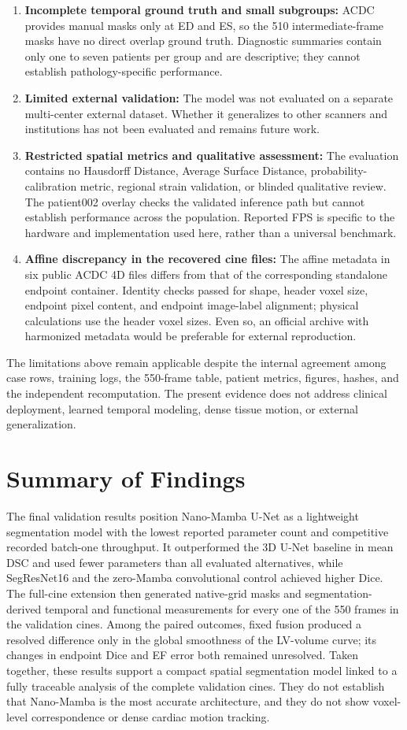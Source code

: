 \begin{enumerate}
    \item \textbf{Incomplete temporal ground truth and small subgroups:} ACDC provides manual masks only at ED and ES, so the 510 intermediate-frame masks have no direct overlap ground truth. Diagnostic summaries contain only one to seven patients per group and are descriptive; they cannot establish pathology-specific performance.
    \item \textbf{Limited external validation:} The model was not evaluated on a separate multi-center external dataset. Whether it generalizes to other scanners and institutions has not been evaluated and remains future work.
    \item \textbf{Restricted spatial metrics and qualitative assessment:} The evaluation contains no Hausdorff Distance, Average Surface Distance, probability-calibration metric, regional strain validation, or blinded qualitative review. The patient002 overlay checks the validated inference path but cannot establish performance across the population. Reported FPS is specific to the hardware and implementation used here, rather than a universal benchmark.
    \item \textbf{Affine discrepancy in the recovered cine files:} The affine metadata in six public ACDC 4D files differs from that of the corresponding standalone endpoint container. Identity checks passed for shape, header voxel size, endpoint pixel content, and endpoint image-label alignment; physical calculations use the header voxel sizes. Even so, an official archive with harmonized metadata would be preferable for external reproduction.
\end{enumerate}

The limitations above remain applicable despite the internal agreement among case rows, training logs, the 550-frame table, patient metrics, figures, hashes, and the independent recomputation. The present evidence does not address clinical deployment, learned temporal modeling, dense tissue motion, or external generalization.

\section{Summary of Findings}
The final validation results position Nano-Mamba U-Net as a lightweight segmentation model with the lowest reported parameter count and competitive recorded batch-one throughput. It outperformed the 3D U-Net baseline in mean DSC and used fewer parameters than all evaluated alternatives, while SegResNet16 and the zero-Mamba convolutional control achieved higher Dice. The full-cine extension then generated native-grid masks and segmentation-derived temporal and functional measurements for every one of the 550 frames in the validation cines. Among the paired outcomes, fixed fusion produced a resolved difference only in the global smoothness of the LV-volume curve; its changes in endpoint Dice and EF error both remained unresolved. Taken together, these results support a compact spatial segmentation model linked to a fully traceable analysis of the complete validation cines. They do not establish that Nano-Mamba is the most accurate architecture, and they do not show voxel-level correspondence or dense cardiac motion tracking.
